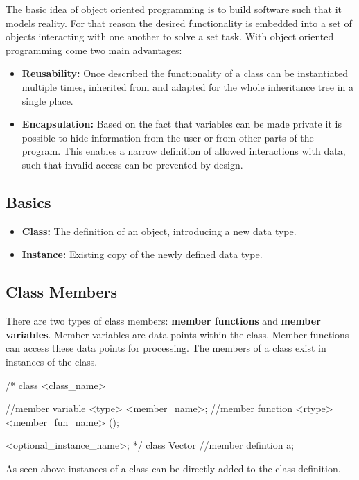 \documentclass[10pt,a4paper]{scrartcl}
\begin{document}
\begin{multicols*}{2}
The basic idea of object oriented programming is to build software such that it models reality. For that reason the desired functionality is embedded into a set of objects interacting with one another to solve a set task. With object oriented programming come two main advantages:

\begin{itemize}
\item \textbf{Reusability:} Once described the functionality of a class can be instantiated multiple times, inherited from and adapted for the whole inheritance tree in a single place.
\item \textbf{Encapsulation:} Based on the fact that variables can be made private it is possible to hide information from the user or from other parts of the program. This enables a narrow definition of allowed interactions with data, such that invalid access can be prevented by design.
\end{itemize}

\subsection{Basics}
\label{sec:Basics}

\begin{itemize}
\item \textbf{Class:} The definition of an object, introducing a new data type.
\item \textbf{Instance:} Existing copy of the newly defined data type.
\end{itemize}

\subsection{Class Members}
\label{sec:ClassMembers}

There are two types of class members: \textbf{member functions} and \textbf{member variables}. Member variables are data points within the class. Member functions can access these data points for processing. The members of a class exist in instances of the class.

\begin{TPCpp}
/*
class <class_name> {
	//member variable
	<type> <member_name>;
	//member function
	<rtype> <member_fun_name> ();
	
}<optional_instance_name>;
*/
class Vector {
	//member defintion
}a;
\end{TPCpp}

As seen above instances of a class can be directly added to the class definition.


\end{multicols*}
\end{document}
